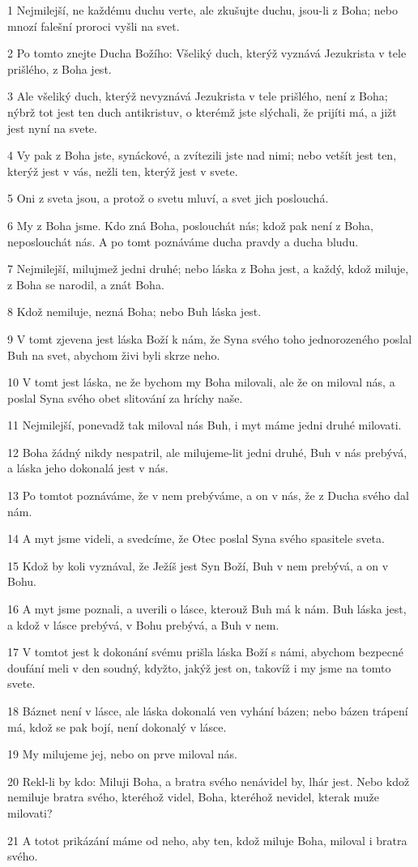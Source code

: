 \par 1 Nejmilejší, ne každému duchu verte, ale zkušujte duchu, jsou-li z Boha; nebo mnozí falešní proroci vyšli na svet.
\par 2 Po tomto znejte Ducha Božího: Všeliký duch, kterýž vyznává Jezukrista v tele prišlého, z Boha jest.
\par 3 Ale všeliký duch, kterýž nevyznává Jezukrista v tele prišlého, není z Boha; nýbrž tot jest ten duch antikristuv, o kterémž jste slýchali, že prijíti má, a jižt jest nyní na svete.
\par 4 Vy pak z Boha jste, synáckové, a zvítezili jste nad nimi; nebo vetšít jest ten, kterýž jest v vás, nežli ten, kterýž jest v svete.
\par 5 Oni z sveta jsou, a protož o svetu mluví, a svet jich poslouchá.
\par 6 My z Boha jsme. Kdo zná Boha, poslouchát nás; kdož pak není z Boha, neposlouchát nás. A po tomt poznáváme ducha pravdy a ducha bludu.
\par 7 Nejmilejší, milujmež jedni druhé; nebo láska z Boha jest, a každý, kdož miluje, z Boha se narodil, a znát Boha.
\par 8 Kdož nemiluje, nezná Boha; nebo Buh láska jest.
\par 9 V tomt zjevena jest láska Boží k nám, že Syna svého toho jednorozeného poslal Buh na svet, abychom živi byli skrze neho.
\par 10 V tomt jest láska, ne že bychom my Boha milovali, ale že on miloval nás, a poslal Syna svého obet slitování za hríchy naše.
\par 11 Nejmilejší, ponevadž tak miloval nás Buh, i myt máme jedni druhé milovati.
\par 12 Boha žádný nikdy nespatril, ale milujeme-lit jedni druhé, Buh v nás prebývá, a láska jeho dokonalá jest v nás.
\par 13 Po tomtot poznáváme, že v nem prebýváme, a on v nás, že z Ducha svého dal nám.
\par 14 A myt jsme videli, a svedcíme, že Otec poslal Syna svého spasitele sveta.
\par 15 Kdož by koli vyznával, že Ježíš jest Syn Boží, Buh v nem prebývá, a on v Bohu.
\par 16 A myt jsme poznali, a uverili o lásce, kterouž Buh má k nám. Buh láska jest, a kdož v lásce prebývá, v Bohu prebývá, a Buh v nem.
\par 17 V tomtot jest k dokonání svému prišla láska Boží s námi, abychom bezpecné doufání meli v den soudný, kdyžto, jakýž jest on, takovíž i my jsme na tomto svete.
\par 18 Báznet není v lásce, ale láska dokonalá ven vyhání bázen; nebo bázen trápení má, kdož se pak bojí, není dokonalý v lásce.
\par 19 My milujeme jej, nebo on prve miloval nás.
\par 20 Rekl-li by kdo: Miluji Boha, a bratra svého nenávidel by, lhár jest. Nebo kdož nemiluje bratra svého, kteréhož videl, Boha, kteréhož nevidel, kterak muže milovati?
\par 21 A totot prikázání máme od neho, aby ten, kdož miluje Boha, miloval i bratra svého.

